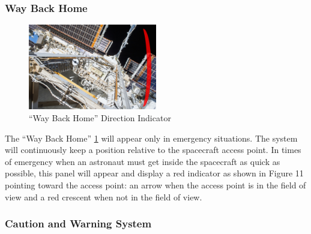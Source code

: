 \documentclass{article}
\let\Oldsubsubsection\subsubsection
\renewcommand{\subsubsection}{\FloatBarrier\Oldsubsubsection}
\begin{document}
\subsubsection{Way Back Home}

\begin{figure}[!htb]
  \centering
  \includegraphics[width=0.5\textwidth]{assets/wayhome.png}
  \caption{“Way Back Home” Direction Indicator}
  \label{fig:wayhome}
\end{figure}

The “Way Back Home” \ref{fig:wayhome} will appear only in emergency 
situations. The system will continuously keep a position relative to the 
spacecraft access point. In times of emergency when an astronaut must 
get inside the spacecraft as quick as possible, this panel will appear 
and display a red indicator as shown in Figure 11 pointing toward the 
access point: an arrow when the access point is in the field of view and 
a red crescent when not in the field of view. 

\subsubsection{Caution and Warning System}
\end{document}
